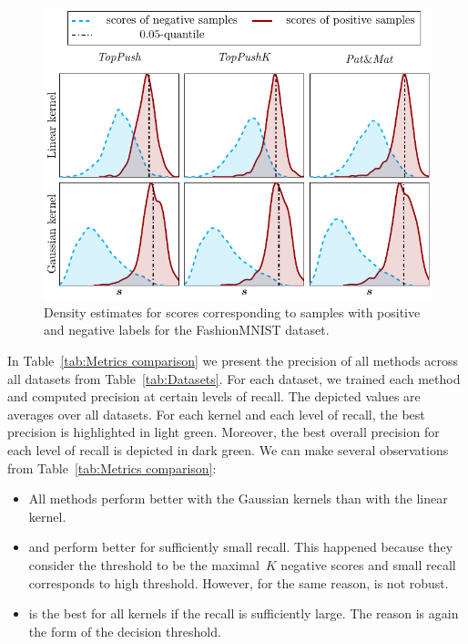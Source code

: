 \begin{figure}[!ht]
  \centering
  \includegraphics[width = \linewidth]{images/dual_results2.pdf}
  \caption{Density estimates for scores corresponding to samples with positive and negative labels for the FashionMNIST dataset.}
  \label{fig:Scores comparison}
\end{figure}

In Table~\ref{tab:Metrics comparison} we present the precision of all methods across all datasets from Table~\ref{tab:Datasets}. For each dataset, we trained each method and computed precision at certain levels of recall. The depicted values are averages over all datasets. For each kernel and each level of recall, the best precision is highlighted in light green. Moreover, the best overall precision for each level of recall is depicted in dark green. We can make several observations from Table~\ref{tab:Metrics comparison}:
\begin{itemize}
  \item All methods perform better with the Gaussian kernels than with the linear kernel. 
  \item \TopPush and \TopPushK perform better for sufficiently small recall. This happened because they consider the threshold to be the maximal~$K$ negative scores and small recall corresponds to high threshold. However, for the same reason, \TopPush is not robust.
  \item \PatMat is the best for all kernels if the recall is sufficiently large. The reason is again the form of the decision threshold.
\end{itemize}

